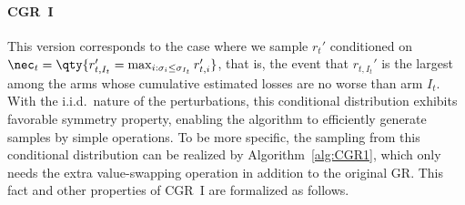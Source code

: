 \paragraph{CGR~I}
This version corresponds to the case where we sample $r_t'$ conditioned on $\nec_t=\qty{r_{t,I_t}'=\max_{i:\sigma_i\leq\sigma_{I_t}}r_{t,i}'}$,
that is, the event that $r_{t,I_t}'$ is the largest among the arms whose cumulative estimated losses are no worse than arm $I_t$.
With the i.i.d.~nature of the perturbations, this conditional distribution exhibits favorable symmetry property, enabling the algorithm to efficiently generate samples by simple operations.
To be more specific, the sampling from this conditional distribution can be realized by Algorithm~\ref{alg:CGR1},
which only needs the extra value-swapping operation in addition to the original GR.
This fact and other properties of CGR~I are formalized as follows.
